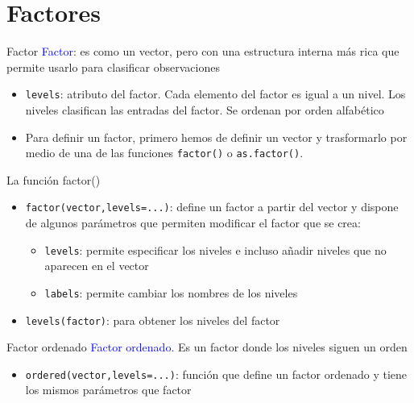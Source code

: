 \documentclass[
  ignorenonframetext,
]{beamer}
\providecommand{\tightlist}{%
  \setlength{\itemsep}{0pt}\setlength{\parskip}{0pt}}
\newcommand\blue[1]{\textcolor{blue}{#1}}
\begin{document}
\section{Factores}\label{factores}

\begin{frame}[fragile]{Factor}
\label{factor}
\blue{Factor}: es como un vector, pero con una estructura interna más
rica que permite usarlo para clasificar observaciones

\begin{itemize}
\tightlist
\item
  \texttt{levels}: atributo del factor. Cada elemento del factor es
  igual a un nivel. Los niveles clasifican las entradas del factor. Se
  ordenan por orden alfabético
\item
  Para definir un factor, primero hemos de definir un vector y
  trasformarlo por medio de una de las funciones \texttt{factor()} o
  \texttt{as.factor()}.
\end{itemize}
\end{frame}

\begin{frame}[fragile]{La función factor()}
\label{la-funciuxf3n-factor}
\begin{itemize}
\item
  \texttt{factor(vector,levels=...)}: define un factor a partir del
  vector y dispone de algunos parámetros que permiten modificar el
  factor que se crea:

  \begin{itemize}
  \tightlist
  \item
    \texttt{levels}: permite especificar los niveles e incluso añadir
    niveles que no aparecen en el vector
  \item
    \texttt{labels}: permite cambiar los nombres de los niveles
  \end{itemize}
\item
  \texttt{levels(factor)}: para obtener los niveles del factor
\end{itemize}
\end{frame}

\begin{frame}[fragile]{Factor ordenado}
\label{factor-ordenado}
\blue{Factor ordenado.} Es un factor donde los niveles siguen un orden

\begin{itemize}
\tightlist
\item
  \texttt{ordered(vector,levels=...)}: función que define un factor
  ordenado y tiene los mismos parámetros que factor
\end{itemize}
\end{frame}
\end{document}
